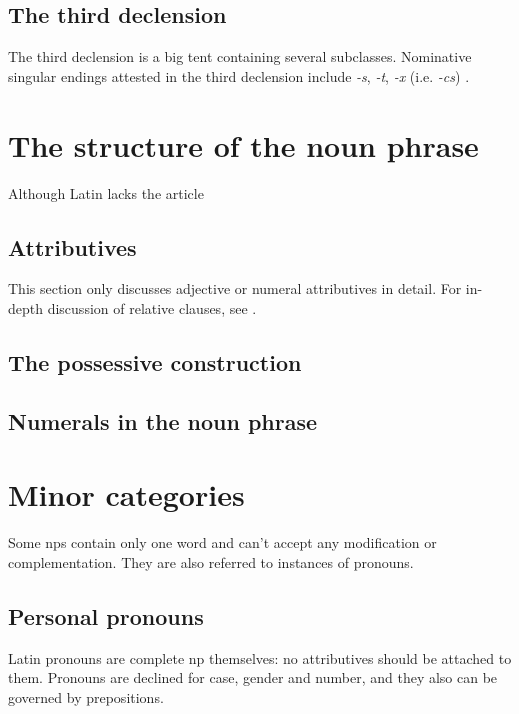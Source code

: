 \documentclass[a4paper, oneside, 12pt]{report}
\newcommand*{\citesec}[1]{\S~{#1}}
\newcommand{\form}[1]{\emph{#1}}
\begin{document}
\subsection{The third declension}\label{sec:np.inflection.3}

The third declension is a big tent containing several subclasses.
Nominative singular endings attested in the third declension
include \form{-s}, \form{-t}, \form{-x} (i.e. \form{-cs}) \citep[\citesec{53}]{allen1903allen}.

\section{The structure of the noun phrase}

Although Latin lacks the article 

\subsection{Attributives}

This section only discusses adjective or numeral attributives in detail.
For in-depth discussion of relative clauses, see .


\subsection{The possessive construction}

\subsection{Numerals in the noun phrase}

\section{Minor categories}

Some \acs{np}s contain only one word and can't accept any modification or complementation.
They are also referred to instances of pronouns.

\subsection{Personal pronouns}\label{sec:np.pronoun}

Latin pronouns are complete \acs{np} themselves:
no attributives should be attached to them. 
Pronouns are declined for case, gender and number,
and they also can be governed by prepositions.
\end{document}
